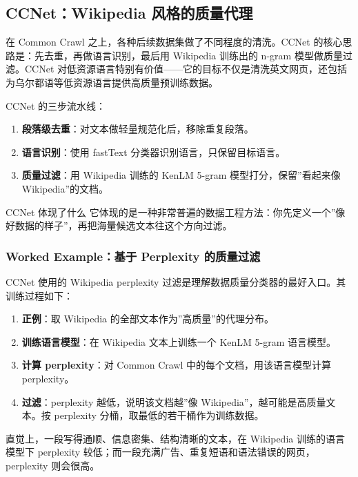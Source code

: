 \subsection{CCNet：Wikipedia 风格的质量代理}

在 Common Crawl 之上，各种后续数据集做了不同程度的清洗。CCNet 的核心思路是：先去重，再做语言识别，最后用 Wikipedia 训练出的 n-gram 模型做质量过滤。CCNet 对低资源语言特别有价值——它的目标不仅是清洗英文网页，还包括为乌尔都语等低资源语言提供高质量预训练数据。

CCNet 的三步流水线：
\begin{enumerate}
    \item \textbf{段落级去重}：对文本做轻量规范化后，移除重复段落。
    \item \textbf{语言识别}：使用 fastText 分类器识别语言，只保留目标语言。
    \item \textbf{质量过滤}：用 Wikipedia 训练的 KenLM 5-gram 模型打分，保留”看起来像 Wikipedia”的文档。
\end{enumerate}

\begin{importantbox}{CCNet 体现了什么}
它体现的是一种非常普遍的数据工程方法：你先定义一个”像好数据的样子”，再把海量候选文本往这个方向过滤。
\end{importantbox}

\subsubsection{Worked Example：基于 Perplexity 的质量过滤}

CCNet 使用的 Wikipedia perplexity 过滤是理解数据质量分类器的最好入口。其训练过程如下：

\begin{enumerate}
    \item \textbf{正例}：取 Wikipedia 的全部文本作为”高质量”的代理分布。
    \item \textbf{训练语言模型}：在 Wikipedia 文本上训练一个 KenLM 5-gram 语言模型。
    \item \textbf{计算 perplexity}：对 Common Crawl 中的每个文档，用该语言模型计算 perplexity。
    \item \textbf{过滤}：perplexity 越低，说明该文档越”像 Wikipedia”，越可能是高质量文本。按 perplexity 分桶，取最低的若干桶作为训练数据。
\end{enumerate}

直觉上，一段写得通顺、信息密集、结构清晰的文本，在 Wikipedia 训练的语言模型下 perplexity 较低；而一段充满广告、重复短语和语法错误的网页，perplexity 则会很高。


